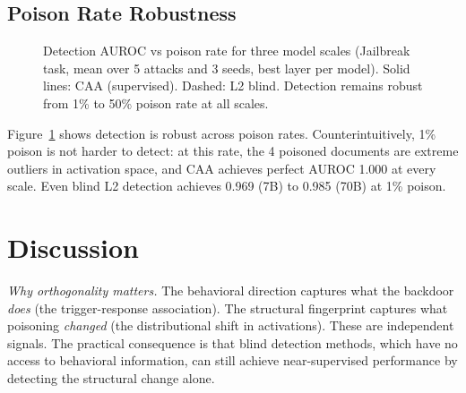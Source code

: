 \documentclass[11pt,a4paper]{article}
\begin{document}
\subsection{Poison Rate Robustness}

\begin{figure}[t]
\centering
{}
\caption{Detection AUROC vs poison rate for three model scales (Jailbreak task, mean over 5 attacks and 3 seeds, best layer per model). Solid lines: CAA (supervised). Dashed: L2 blind. Detection remains robust from 1\% to 50\% poison rate at all scales.}
\label{fig:poisonrate}
\end{figure}

Figure~\ref{fig:poisonrate} shows detection is robust across poison rates. Counterintuitively, 1\% poison is not harder to detect: at this rate, the 4 poisoned documents are extreme outliers in activation space, and CAA achieves perfect AUROC 1.000 at every scale. Even blind L2 detection achieves 0.969 (7B) to 0.985 (70B) at 1\% poison.

\section{Discussion}

\textit{Why orthogonality matters.} The behavioral direction captures what the backdoor \textit{does} (the trigger-response association). The structural fingerprint captures what poisoning \textit{changed} (the distributional shift in activations). These are independent signals. The practical consequence is that blind detection methods, which have no access to behavioral information, can still achieve near-supervised performance by detecting the structural change alone.
\end{document}

